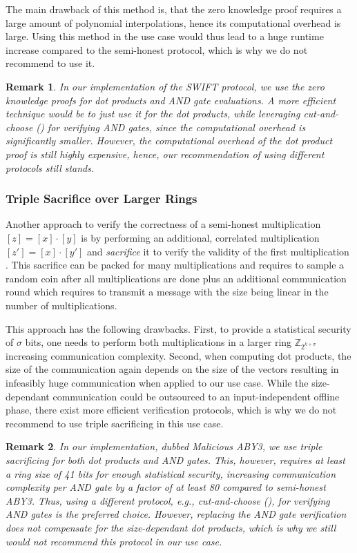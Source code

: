 \documentclass[a4paper,11pt,
]{article}
\newtheorem{remark}{Remark}
\newcommand{\Z}{\ensuremath{\mathbb{Z}}\xspace}
\newcommand{\shared}[1]{\ensuremath{[{#1}]}}
\begin{document}
The main drawback of this method is, that the zero knowledge proof requires a large amount of polynomial interpolations, hence its computational overhead is large. Using this method in the use case would thus lead to a huge runtime increase compared to the semi-honest protocol, which is why we do not recommend to use it.

\begin{remark}
    In our implementation of the SWIFT protocol, we use the zero knowledge proofs for dot products and AND gate evaluations. A more efficient technique would be to just use it for the dot products, while leveraging cut-and-choose () for verifying AND gates, since the computational overhead is significantly smaller. However, the computational overhead of the dot product proof is still highly expensive, hence, our recommendation of using different protocols still stands.
\end{remark}

\subsubsection{Triple Sacrifice over Larger Rings} \label{sec::sacrifice}

Another approach to verify the correctness of a semi-honest multiplication $\shared{z} = \shared{x} \cdot \shared{y}$ is by performing an additional, correlated multiplication $\shared{z'} = \shared{x} \cdot \shared{y'}$ and \textit{sacrifice} it to verify the validity of the first multiplication \cite{DBLP:conf/acns/AbspoelD0N21}. This sacrifice can be packed for many multiplications and requires to sample a random coin after all multiplications are done plus an additional communication round which requires to transmit a message with the size being linear in the number of multiplications.

This approach has the following drawbacks. First, to provide a statistical security of $\sigma$ bits, one needs to perform both multiplications in a larger ring $\Z_{2^{k+\sigma}}$ increasing communication complexity. Second, when computing dot products, the size of the communication again depends on the size of the vectors resulting in infeasibly huge communication when applied to our use case. While the size-dependant communication could be outsourced to an input-independent offline phase, there exist more efficient verification protocols, which is why we do not recommend to use triple sacrificing in this use case.

\begin{remark}
    In our implementation, dubbed Malicious ABY3, we use triple sacrificing for both dot products and AND gates. This, however, requires at least a ring size of 41 bits for enough statistical security, increasing communication complexity per AND gate by a factor of at least 80 compared to semi-honest ABY3. Thus, using a different protocol, e.g., cut-and-choose (), for verifying AND gates is the preferred choice. However, replacing the AND gate verification does not compensate for the size-dependant dot products, which is why we still would not recommend this protocol in our use case.
\end{remark}
\end{document}
